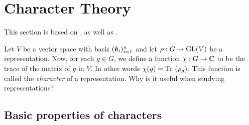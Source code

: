 \clearpage{\thispagestyle{empty}}
\section{Character Theory}


This section is based on \cite[Ch.2.]{Serre}, as well as \cite[Sect.2.2.]{FultonHarris}.

Let $V$ be a vector space with basis $(\mathbf{\hat{e}}_i)_{i=1}^n$ and let $\rho: G \rightarrow \text{GL}(V)$ be a representation. Now, for each $g \in G$, we define a function $\chi: G \rightarrow \mathbb{C}$ to be the trace of the matrix of $g$ in $V$. In other words $\chi(g) = \text{Tr }(\rho_g)$. This function is called the \emph{character} of a representation. Why is it useful when studying representations?

\subsection{Basic properties of characters}

